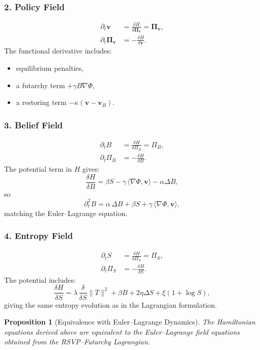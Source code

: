 \documentclass[12pt]{article}
\newtheorem{proposition}{Proposition}
\begin{document}
\subsubsection*{2. Policy Field}
\begin{align}
\partial_t \mathbf{v}
&= \frac{\delta H}{\delta \bm{\Pi}_{\mathbf{v}}}
= \bm{\Pi}_{\mathbf{v}}, \\[4pt]
\partial_t \bm{\Pi}_{\mathbf{v}}
&= -\frac{\delta H}{\delta \mathbf{v}}.
\end{align}
The functional derivative includes:
\begin{itemize}
    \item equilibrium penalties,
    \item a futarchy term $+\gamma B \nabla \Phi$,
    \item a restoring term $-\kappa (\mathbf{v}-\mathbf{v}_B)$.
\end{itemize}

\subsubsection*{3. Belief Field}
\begin{align}
\partial_t B
&= \frac{\delta H}{\delta \Pi_B}
= \Pi_B, \\[4pt]
\partial_t \Pi_B
&= -\frac{\delta H}{\delta B}.
\end{align}
The potential term in $H$ gives:
\[
\frac{\delta H}{\delta B}
=
\beta S
- \gamma\,\langle \nabla \Phi,\mathbf{v} \rangle
- \alpha \Delta B,
\]
so
\[
\partial_t^2 B
=
\alpha\,\Delta B
+ \beta S
+ \gamma\,\langle \nabla \Phi,\mathbf{v} \rangle,
\]
matching the Euler--Lagrange equation.

\subsubsection*{4. Entropy Field}
\begin{align}
\partial_t S
&= \frac{\delta H}{\delta \Pi_S}
= \Pi_S, \\[4pt]
\partial_t \Pi_S
&= -\frac{\delta H}{\delta S}.
\end{align}
The potential includes:
\[
\frac{\delta H}{\delta S}
=
\lambda\,\frac{\delta}{\delta S}\|T\|^2
+ \beta B
+ 2\eta \Delta S
+ \xi(1+\log S),
\]
giving the same entropy evolution as in the Lagrangian formulation.

\begin{proposition}[Equivalence with Euler--Lagrange Dynamics]
The Hamiltonian equations derived above are equivalent to the
Euler--Lagrange field equations obtained from the RSVP--Futarchy
Lagrangian.
\end{proposition}
\end{document}

